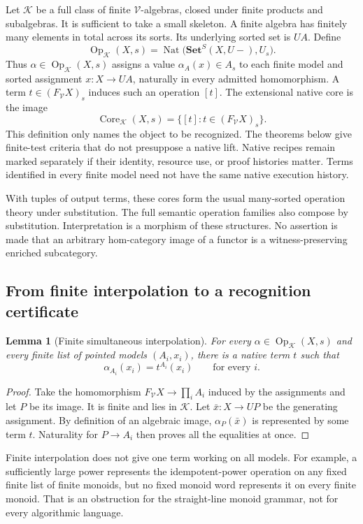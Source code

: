\documentclass[11pt]{article}
\newtheorem{lemma}[theorem]{Lemma}
\theoremstyle{definition}
\theoremstyle{remark}
\newcommand{\Set}{\mathbf{Set}}
\newcommand{\Op}{\operatorname{Op}}
\newcommand{\Nat}{\operatorname{Nat}}
\newcommand{\Core}{\operatorname{Core}}
\begin{document}
Let $\mathcal K$ be a full class of finite $\mathcal V$-algebras, closed
under finite products and subalgebras. It is sufficient to take a small
skeleton. A finite algebra has finitely many elements in total across its
sorts. Its underlying sorted set is $UA$. Define
\[
 \Op_{\mathcal K}(X,s)
 =\Nat\bigl(\Set^S(X,U-),U_s\bigr).
\]
Thus $\alpha\in\Op_{\mathcal K}(X,s)$ assigns a value
$\alpha_A(x)\in A_s$ to each finite model and sorted assignment
$x:X\to UA$, naturally in every admitted homomorphism.
A term $t\in(F_{\mathcal V}X)_s$ induces such an operation $[t]$.
The extensional native core is the image
\[
 \Core_{\mathcal K}(X,s)
 =\{[t]:t\in(F_{\mathcal V}X)_s\}.
\]
This definition only names the object to be recognized. The theorems below
give finite-test criteria that do not presuppose a native lift.
Native recipes remain marked separately if their identity, resource use,
or proof histories matter. Terms identified in every finite model need not
have the same native execution history.

With tuples of output terms, these cores form the usual many-sorted
operation theory under substitution. The full semantic operation families
also compose by substitution. Interpretation is a morphism of these
structures. No assertion is made that an arbitrary hom-category image
of a functor is a witness-preserving enriched subcategory.

\subsection{From finite interpolation to a recognition certificate}

\begin{lemma}[Finite simultaneous interpolation]\label{alg-lem:interpolation}
For every $\alpha\in\Op_{\mathcal K}(X,s)$ and every finite list of
pointed models $(A_i,x_i)$, there is a native term $t$ such that
\[
             \alpha_{A_i}(x_i)=t^{A_i}(x_i)
             \qquad\text{for every }i.
\]
\end{lemma}
\begin{proof}
Take the homomorphism
$F_{\mathcal V}X\to\prod_iA_i$ induced by the assignments and let $P$
be its image. It is finite and lies in $\mathcal K$. Let
$\bar x:X\to UP$ be the generating assignment. By definition of an
algebraic image, $\alpha_P(\bar x)$ is represented by some term $t$.
Naturality for $P\to A_i$ then proves all the equalities at once.
\end{proof}

Finite interpolation does not give one term working on all models.
For example, a sufficiently large power represents the idempotent-power
operation on any fixed finite list of finite monoids, but no fixed monoid
word represents it on every finite monoid. That is an obstruction for the
straight-line monoid grammar, not for every algorithmic language.
\end{document}
